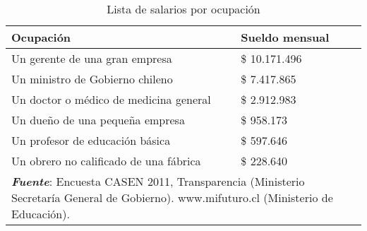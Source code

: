 \begin{table}[H]
\begin{center}
\caption{Lista de salarios por ocupación}
\begin{tabular}{ll}
\toprule
\textbf{Ocupación}                                                                            										 &\textbf{Sueldo mensual} \\ 
\midrule
Un gerente de una gran empresa                                                                                                 & \$ 10.171.496           \\
Un ministro de Gobierno chileno                                                                                                & \$ 7.417.865            \\
Un doctor o médico de medicina general                                                                                         & \$ 2.912.983            \\
Un dueño de una pequeña empresa                                                                                                & \$  958.173             \\
Un profesor de educación básica                                                                                                & \$  597.646             \\
Un obrero no calificado de una fábrica                                                                                         & \$  228.640             \\
\bottomrule																													  
\multicolumn{2}{m{11cm}}{\footnotesize{\parbox{1.0\linewidth}{\vspace{2pt} \textbf{\textit{Fuente}}: Encuesta CASEN 2011, Transparencia (Ministerio Secretaría General de Gobierno). www.mifuturo.cl (Ministerio de Educación).}}} 
\end{tabular}
\end{center}
\end{table}